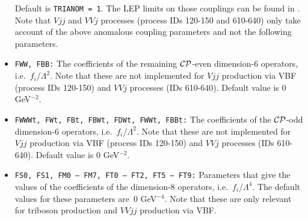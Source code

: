 \documentclass[english,12pt]{article}
\begin{document}
\begin{itemize}
  Default is {\tt TRIANOM = 1}. The LEP limits on those couplings can be found in \cite{Schael:2013ita}.
Note that $Vjj$ and $VVj$ processes (process IDs 120-150 and 610-640) only take account of the above anomalous  coupling parameters and not the following parameters.
 \item {\tt FWW, FBB:} The coefficients of the remaining $\cal{CP}$-even
dimension-6 operators, i.e.\ $f_{i}$/$\Lambda^{2}$.  Note that these are not
implemented for $Vjj$ production via VBF (process IDs 120-150) and $VVj$
processes (IDs 610-640).  Default value is 0 GeV$^{-2}$.
 \item {\tt FWWWt, FWt, FBt, FBWt, FDWt, FWWt, FBBt:} The coefficients of the
$\cal{CP}$-odd di\-mension-6 operators, i.e.\ $f_{i}$/$\Lambda^{2}$.  Note that
these are
not implemented for $Vjj$ production via VBF (process IDs 120-150) and $VVj$
processes (IDs 610-640).  Default value is 0  GeV$^{-2}$.
 \item {\tt  FS0, FS1, FM0 -- FM7, FT0 -- FT2, FT5 -- FT9:} Parameters that give
the values of the coefficients of the dimension-8 operators, i.e.\
$f_{i}$/$\Lambda^{4}$. The default values for these parameters are~0 GeV$^{-4}$.  Note that
these are only relevant for triboson production and $VVjj$ production via VBF.
\end{itemize}
\end{document}

